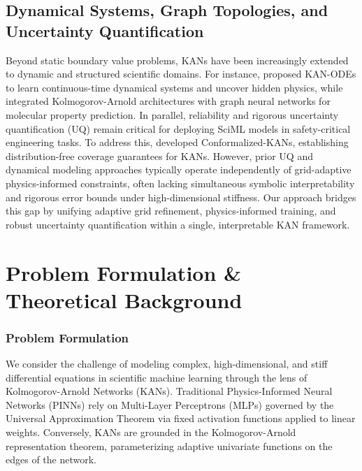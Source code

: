 \documentclass[10pt,twocolumn]{article}
\begin{document}
\subsection{Dynamical Systems, Graph Topologies, and Uncertainty Quantification}
Beyond static boundary value problems, KANs have been increasingly extended to dynamic and structured scientific domains. For instance, \cite{ref_4} proposed KAN-ODEs to learn continuous-time dynamical systems and uncover hidden physics, while \cite{ref_2} integrated Kolmogorov-Arnold architectures with graph neural networks for molecular property prediction. In parallel, reliability and rigorous uncertainty quantification (UQ) remain critical for deploying SciML models in safety-critical engineering tasks. To address this, \cite{ref_1} developed Conformalized-KANs, establishing distribution-free coverage guarantees for KANs. However, prior UQ and dynamical modeling approaches typically operate independently of grid-adaptive physics-informed constraints, often lacking simultaneous symbolic interpretability and rigorous error bounds under high-dimensional stiffness. Our approach bridges this gap by unifying adaptive grid refinement, physics-informed training, and robust uncertainty quantification within a single, interpretable KAN framework.

\section{Problem Formulation \& Theoretical Background}
\subsubsection{Problem Formulation}
We consider the challenge of modeling complex, high-dimensional, and stiff differential equations in scientific machine learning through the lens of Kolmogorov-Arnold Networks (KANs). Traditional Physics-Informed Neural Networks (PINNs) rely on Multi-Layer Perceptrons (MLPs) governed by the Universal Approximation Theorem via fixed activation functions applied to linear weights. Conversely, KANs are grounded in the Kolmogorov-Arnold representation theorem, parameterizing adaptive univariate functions on the edges of the network. 
\end{document}
